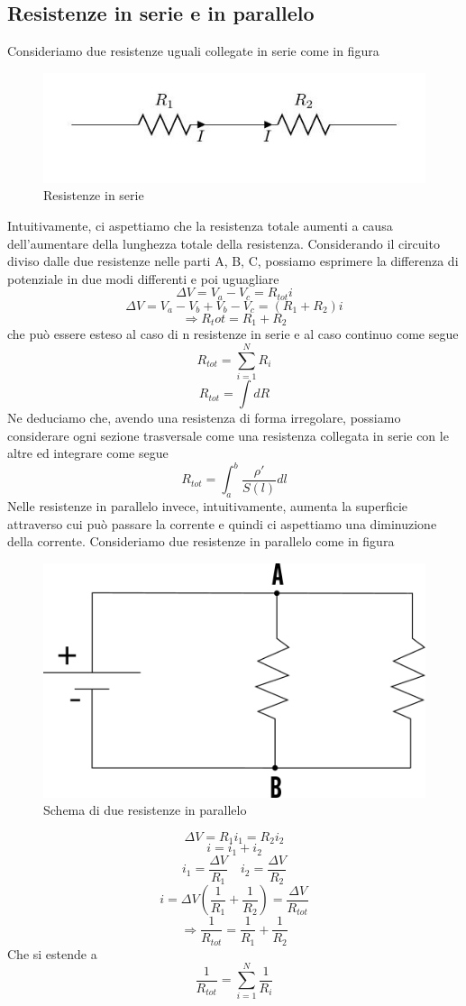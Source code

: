 \documentclass[
10pt, %
a4paper, %
oneside, %
headinclude,footinclude, %
BCOR5mm, %
]{scrartcl}
\begin{document}
\subsection{Resistenze in serie e in parallelo}
Consideriamo due resistenze uguali collegate in serie come in figura
\begin{figure}[h!]
	\centering
	\includegraphics[width=0.6\linewidth]{images/resistenze_serie}
	\caption{Resistenze in serie}
	\label{fig:resistenzeserie}
\end{figure}
\FloatBarrier
Intuitivamente, ci aspettiamo che la resistenza totale aumenti a causa dell'aumentare della lunghezza totale della resistenza. Considerando il circuito diviso dalle due resistenze nelle parti A, B, C, possiamo esprimere la differenza di potenziale in due modi differenti e poi uguagliare
\[\Delta V = V_a - V_c = R_{tot}i\]
\[\Delta V = V_a -V_b + V_b- V_c = (R_1 + R_2)i\]
\[\Rightarrow R_tot = R_1 + R_2\]
che può essere esteso al caso di n resistenze in serie e al caso continuo come segue
\[R_{tot} = \sum_{i=1}^N R_i \]
\[R_{tot} = \int dR\]
Ne deduciamo che, avendo una resistenza di forma irregolare, possiamo considerare ogni sezione trasversale come una resistenza collegata in serie con le altre ed integrare come segue
\[R_{tot}= \int_{a}^{b}\frac{\rho'}{S(l)}dl\]
Nelle resistenze in parallelo invece, intuitivamente, aumenta la superficie attraverso cui può passare la corrente e quindi ci aspettiamo una diminuzione della corrente. Consideriamo due resistenze in parallelo come in figura
\begin{figure}[h!]
	\centering
	\includegraphics[width=0.5\linewidth]{images/resistenze_parallelo}
	\caption{Schema di due resistenze in parallelo}
	\label{fig:resistenzeparallelo}
\end{figure}
\FloatBarrier
\[\Delta V = R_1i_1= R_2i_2\]
\[i = i_1+i_2\]
\[i_1 = \frac{\Delta V}{R_1}\quad i_2 = \frac{\Delta V}{R_2} \]
\[ i = \Delta V \left(\frac{1}{R_1}+\frac{1}{R_2}\right)= \frac{\Delta V}{R_{tot}} \]
\[\Rightarrow \frac{1}{R_{tot}} = \frac{1}{R_1}+\frac{1}{R_2} \]
Che si estende a 
\[\frac{1}{R_{tot}}= \sum_{i = 1}^N\frac{1}{R_i}\]
\end{document}

